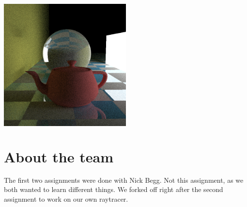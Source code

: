 
\includegraphics[width=0.5\textwidth]{img/teapot-in-front-of-sphere.png}

\section{About the team}
The first two assignments were done with Nick Begg.
Not this assignment, as we both wanted to learn different things.
We forked off right after the second assignment to work on our own raytracer.

